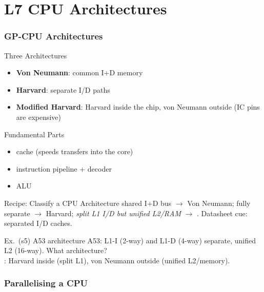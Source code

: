 \section{L7 CPU Architectures}

\subsubsection{GP-CPU Architectures}


\begin{definition}{Three Architectures}
    \begin{itemize}
        \item \textbf{Von Neumann}: common I+D memory
        \item \textbf{Harvard}: separate I/D paths
        \item \textbf{Modified Harvard}: Harvard inside the chip, von Neumann outside (IC pins are expensive)
    \end{itemize}
\end{definition}

\begin{definition}{Fundamental Parts}
    \begin{itemize}
        \item cache (speeds transfers into the core)
        \item instruction pipeline + decoder
        \item ALU
    \end{itemize}
\end{definition}

\multend

\begin{KR}{Recipe: Classify a CPU Architecture}
    shared I+D bus $\to$ Von Neumann; fully separate $\to$ Harvard; \emph{split L1 I/D but unified L2/RAM} $\to$ . Datasheet cue: separated I/D caches.
\end{KR}

\begin{example2}{Ex.\ (s5) A53 architecture}
    A53: L1-I (2-way) and L1-D (4-way) separate, unified L2 (16-way). What architecture?
     \\ 
    : Harvard inside (split L1), von Neumann outside (unified L2/memory).
\end{example2}

\subsubsection{Parallelising a CPU}

